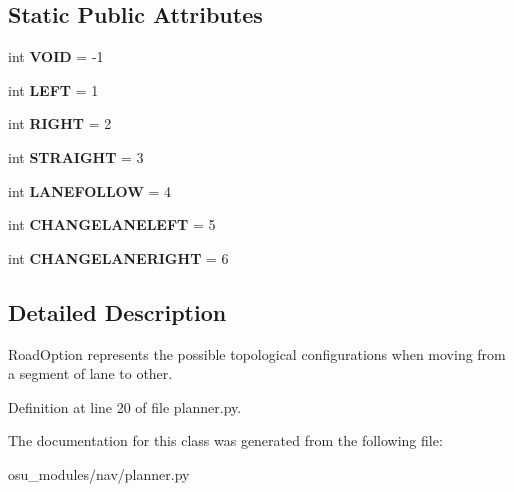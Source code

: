 \subsection*{Static Public Attributes}
\begin{DoxyCompactItemize}
\item 
\mbox{\label{classscripts_1_1osu__modules_1_1nav_1_1planner_1_1RoadOption_a11904a5308afd8c0c3975d2a8e2d93f2}} 
int {\bfseries V\+O\+ID} = -\/1
\item 
\mbox{\label{classscripts_1_1osu__modules_1_1nav_1_1planner_1_1RoadOption_a411df6d7b4f5153f9f559b516315a4a8}} 
int {\bfseries L\+E\+FT} = 1
\item 
\mbox{\label{classscripts_1_1osu__modules_1_1nav_1_1planner_1_1RoadOption_a4c71a9c497ca57d32c273cb210cc9738}} 
int {\bfseries R\+I\+G\+HT} = 2
\item 
\mbox{\label{classscripts_1_1osu__modules_1_1nav_1_1planner_1_1RoadOption_ab7b28c01745bcc01b76e79b612de4b11}} 
int {\bfseries S\+T\+R\+A\+I\+G\+HT} = 3
\item 
\mbox{\label{classscripts_1_1osu__modules_1_1nav_1_1planner_1_1RoadOption_a9c1f5ebd033e3ad4c3a07ca1d7d93db2}} 
int {\bfseries L\+A\+N\+E\+F\+O\+L\+L\+OW} = 4
\item 
\mbox{\label{classscripts_1_1osu__modules_1_1nav_1_1planner_1_1RoadOption_ad18c2dd28c8d088fb15079b8154c0cd5}} 
int {\bfseries C\+H\+A\+N\+G\+E\+L\+A\+N\+E\+L\+E\+FT} = 5
\item 
\mbox{\label{classscripts_1_1osu__modules_1_1nav_1_1planner_1_1RoadOption_a0c49b4887e9532ab7596650417fbcef1}} 
int {\bfseries C\+H\+A\+N\+G\+E\+L\+A\+N\+E\+R\+I\+G\+HT} = 6
\end{DoxyCompactItemize}


\subsection{Detailed Description}
\begin{DoxyVerb}RoadOption represents the possible topological configurations when moving from a segment of lane to other.
\end{DoxyVerb}
 

Definition at line 20 of file planner.\+py.



The documentation for this class was generated from the following file\+:\begin{DoxyCompactItemize}
\item 
osu\+\_\+modules/nav/planner.\+py\end{DoxyCompactItemize}
